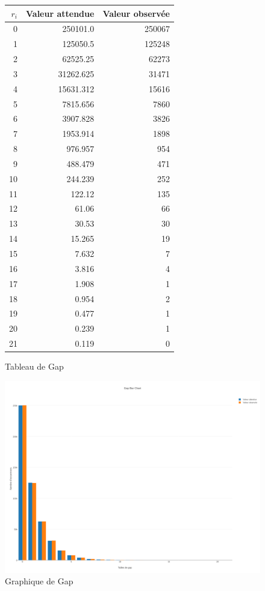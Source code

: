\documentclass[10pt,a4paper]{article}
\begin{document}
\begin{figure}[h]
\centering
\begin{tabular}{|r|r|r|}
\hline
$r_i $ & Valeur attendue & Valeur observée\\
\hline
0 & 250101.0 & 250067\\
1 & 125050.5 & 125248\\
2 & 62525.25 & 62273\\
3 & 31262.625 & 31471\\
4 & 15631.312 & 15616\\
5 & 7815.656 & 7860\\
6 & 3907.828 & 3826\\
7 & 1953.914 & 1898\\
8 & 976.957 & 954\\
9 & 488.479 & 471\\
10 & 244.239 & 252\\
11 & 122.12 & 135\\
12 & 61.06 & 66\\
13 & 30.53 & 30\\
14 & 15.265 & 19\\
15 & 7.632 & 7\\
16 & 3.816 & 4\\
17 & 1.908 & 1\\
18 & 0.954 & 2\\
19 & 0.477 & 1\\
20 & 0.239 & 1\\
21 & 0.119 & 0\\
\hline
\end{tabular}
\caption{Tableau de Gap}
\end{figure}

\begin{figure}[h]
\centering
\includegraphics[scale=0.25]{../chart_images/gap_bar_chart.png}
\caption{Graphique de Gap}
\end{figure}
\newpage
\end{document}
